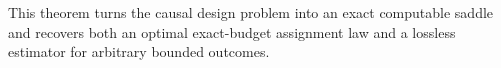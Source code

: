 This theorem turns the causal design problem into an exact computable saddle and recovers both an optimal exact-budget assignment law and a lossless estimator for arbitrary bounded outcomes.
